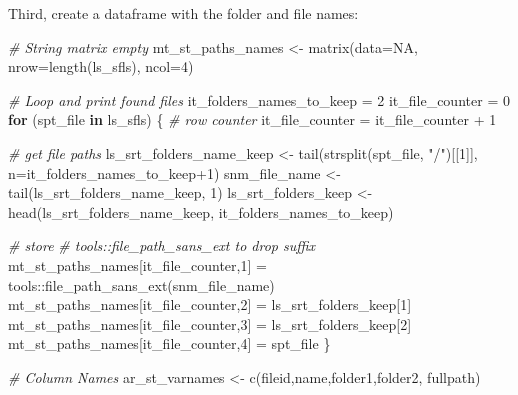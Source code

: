 \documentclass[
]{book}
\newenvironment{Shaded}{\begin{snugshade}}{\end{snugshade}}
\newcommand{\AttributeTok}[1]{\textcolor[rgb]{0.77,0.63,0.00}{#1}}
\newcommand{\CommentTok}[1]{\textcolor[rgb]{0.56,0.35,0.01}{\textit{#1}}}
\newcommand{\ConstantTok}[1]{\textcolor[rgb]{0.00,0.00,0.00}{#1}}
\newcommand{\ControlFlowTok}[1]{\textcolor[rgb]{0.13,0.29,0.53}{\textbf{#1}}}
\newcommand{\DecValTok}[1]{\textcolor[rgb]{0.00,0.00,0.81}{#1}}
\newcommand{\FunctionTok}[1]{\textcolor[rgb]{0.00,0.00,0.00}{#1}}
\newcommand{\NormalTok}[1]{#1}
\newcommand{\OtherTok}[1]{\textcolor[rgb]{0.56,0.35,0.01}{#1}}
\newcommand{\SpecialCharTok}[1]{\textcolor[rgb]{0.00,0.00,0.00}{#1}}
\newcommand{\StringTok}[1]{\textcolor[rgb]{0.31,0.60,0.02}{#1}}
\begin{document}
Third, create a dataframe with the folder and file names:

\begin{Shaded}
\begin{Highlighting}[]
\CommentTok{\# String matrix empty}
\NormalTok{mt\_st\_paths\_names }\OtherTok{\textless{}{-}} \FunctionTok{matrix}\NormalTok{(}\AttributeTok{data=}\ConstantTok{NA}\NormalTok{, }\AttributeTok{nrow=}\FunctionTok{length}\NormalTok{(ls\_sfls), }\AttributeTok{ncol=}\DecValTok{4}\NormalTok{)}

\CommentTok{\# Loop and print found files}
\NormalTok{it\_folders\_names\_to\_keep }\OtherTok{=} \DecValTok{2}
\NormalTok{it\_file\_counter }\OtherTok{=} \DecValTok{0}
\ControlFlowTok{for}\NormalTok{ (spt\_file }\ControlFlowTok{in}\NormalTok{ ls\_sfls) \{}
    \CommentTok{\# row counter}
\NormalTok{    it\_file\_counter }\OtherTok{=}\NormalTok{ it\_file\_counter }\SpecialCharTok{+} \DecValTok{1}

    \CommentTok{\# get file paths}
\NormalTok{    ls\_srt\_folders\_name\_keep }\OtherTok{\textless{}{-}} \FunctionTok{tail}\NormalTok{(}\FunctionTok{strsplit}\NormalTok{(spt\_file, }\StringTok{"/"}\NormalTok{)[[}\DecValTok{1}\NormalTok{]], }\AttributeTok{n=}\NormalTok{it\_folders\_names\_to\_keep}\SpecialCharTok{+}\DecValTok{1}\NormalTok{)}
\NormalTok{    snm\_file\_name }\OtherTok{\textless{}{-}} \FunctionTok{tail}\NormalTok{(ls\_srt\_folders\_name\_keep, }\DecValTok{1}\NormalTok{)}
\NormalTok{    ls\_srt\_folders\_keep }\OtherTok{\textless{}{-}} \FunctionTok{head}\NormalTok{(ls\_srt\_folders\_name\_keep, it\_folders\_names\_to\_keep)}

    \CommentTok{\# store}
    \CommentTok{\# tools::file\_path\_sans\_ext to drop suffix}
\NormalTok{    mt\_st\_paths\_names[it\_file\_counter,}\DecValTok{1}\NormalTok{] }\OtherTok{=}\NormalTok{ tools}\SpecialCharTok{::}\FunctionTok{file\_path\_sans\_ext}\NormalTok{(snm\_file\_name)}
\NormalTok{    mt\_st\_paths\_names[it\_file\_counter,}\DecValTok{2}\NormalTok{] }\OtherTok{=}\NormalTok{ ls\_srt\_folders\_keep[}\DecValTok{1}\NormalTok{]}
\NormalTok{    mt\_st\_paths\_names[it\_file\_counter,}\DecValTok{3}\NormalTok{] }\OtherTok{=}\NormalTok{ ls\_srt\_folders\_keep[}\DecValTok{2}\NormalTok{]}
\NormalTok{    mt\_st\_paths\_names[it\_file\_counter,}\DecValTok{4}\NormalTok{] }\OtherTok{=}\NormalTok{ spt\_file}
\NormalTok{\}}

\CommentTok{\# Column Names}
\NormalTok{ar\_st\_varnames }\OtherTok{\textless{}{-}} \FunctionTok{c}\NormalTok{(}\StringTok{\textquotesingle{}fileid\textquotesingle{}}\NormalTok{,}\StringTok{\textquotesingle{}name\textquotesingle{}}\NormalTok{,}\StringTok{\textquotesingle{}folder1\textquotesingle{}}\NormalTok{,}\StringTok{\textquotesingle{}folder2\textquotesingle{}}\NormalTok{, }\StringTok{\textquotesingle{}fullpath\textquotesingle{}}\NormalTok{)}


\end{Highlighting}
\end{Shaded}
\end{document}
